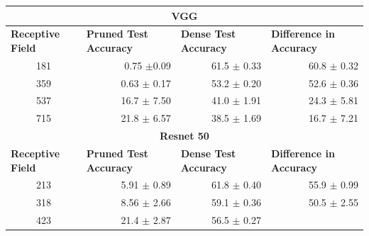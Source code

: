 \begin{table}[H]
\begin{tabular}{crrr}\toprule
\multicolumn{4}{c}{\textbf{VGG}}                                                                                                                                                                          \\ \hline
\multicolumn{1}{l}{\textbf{Receptive Field}} & \multicolumn{1}{l}{\textbf{Pruned Test Accuracy}} & \multicolumn{1}{l}{\textbf{Dense Test Accuracy}} & \multicolumn{1}{l}{\textbf{Difference in Accuracy}} \\
181                                          & 0.75 $\pm$0.09                                    & 61.5 $\pm$ 0.33                                  & 60.8 $\pm$ 0.32                                     \\
359                                          & 0.63 $\pm$ 0.17                                   & 53.2 $\pm$ 0.20                                  & 52.6 $\pm$ 0.36                                     \\
537                                          & 16.7 $\pm$ 7.50                                   & 41.0 $\pm$ 1.91                                  & 24.3 $\pm$ 5.81                                     \\
715                                          & 21.8 $\pm$ 6.57                                   & 38.5 $\pm$ 1.69                                  & 16.7 $\pm$ 7.21                                     \\ \hline
\multicolumn{4}{c}{\textbf{Resnet 50}}                                                                                                                                                                    \\ \hline
\multicolumn{1}{l}{\textbf{Receptive Field}} & \multicolumn{1}{l}{\textbf{Pruned Test Accuracy}} & \multicolumn{1}{l}{\textbf{Dense Test Accuracy}} & \multicolumn{1}{l}{\textbf{Difference in Accuracy}} \\
213                                          & 5.91 $\pm$ 0.89                                   & 61.8 $\pm$ 0.40                                  & 55.9 $\pm$ 0.99                                     \\
318                                          & 8.56 $\pm$ 2.66                                   & 59.1 $\pm$ 0.36                                  & 50.5 $\pm$ 2.55                                     \\
423                                          & 21.4 $\pm$ 2.87                                   & 56.5 $\pm$ 0.27

\end{tabular}
\end{table}
